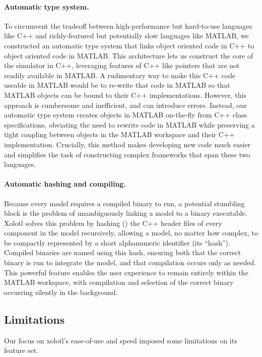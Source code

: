\documentclass{frontiersSCNS} %
\begin{document}
\paragraph{Automatic type system.}
To circumvent the tradeoff between high-performance but hard-to-use languages like C++ and richly-featured but potentially slow languages like MATLAB, we constructed an automatic type system that links object oriented code in C++ to object oriented code in MATLAB. This architecture lets us construct the core of the simulator in C++, leveraging features of C++ like pointers that are not readily available in MATLAB. A rudimentary way to make this C++ code useable in MATLAB would be to re-write that code in MATLAB so that MATLAB objects can be bound to their C++ implementations. However, this approach is cumbersome and inefficient, and can introduce errors. Instead, our automatic type system creates objects in MATLAB on-the-fly from C++ class specifications, obviating the need to rewrite code in MATLAB while preserving a tight coupling between objects in the MATLAB workspace and their C++ implementation. Crucially, this method makes developing new code much easier and simplifies the task of constructing complex frameworks that span these two languages.

\paragraph{Automatic hashing and compiling.}
Because every model requires a compiled binary to run, a potential stumbling block is the problem of unambiguously linking a model to a binary executable. Xolotl solves this problem by hashing (\cite{rivestMD5MessageDigestAlgorithm1992}) the C++ header files of every component in the model recursively, allowing a model, no matter how complex, to be compactly represented by a short alphanumeric identifier (its ``hash''). Compiled binaries are named using this hash, ensuring both that the correct binary is run to integrate the model, and that compilation occurs only as needed. This powerful feature enables the user experience to remain entirely within the MATLAB workspace, with compilation and selection of the correct binary occurring silently in the background.


\subsection{Limitations}
\label{limitations}

Our focus on xolotl's ease-of-use and speed imposed some limitations on its feature set.
\end{document}
